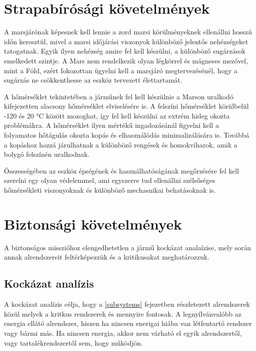 \documentclass[12pt]{report}
\begin{document}
\section{Strapabírósági követelmények}
A marsjárónak képesnek kell lennie a zord marsi körülményeknek ellenállni hosszú időn keresztül, mivel a marsi időjárási viszonyok különböző jelentős nehézségeket tatogatnak. Egyik ilyen nehézség amire fel kell készülni, a különböző sugárzások emelkedett szintje. A Mars nem rendelkezik olyan légkörrel és 
mágneses mezővel, mint a Föld, ezért fokozottan ügyelni kell a marsjáró megtervezésénél, hogy a sugárzás ne csökkenthesse az eszköz tervezett élettartamát. 

A hőmérséklet tekintetében a járműnek fel kell készülnie a Marson uralkodó kifejezetten alacsony hőmérséklet elviselésére is. A felszíni hőmérséklet körülbelül  -120 és 20 °C között mozoghat, így fel kell készülni az extrém hideg okozta problémákra. A hőmérséklet ilyen mértékű ingadozásánál figyelni kell a folyamatos hőtágulás okozta kopás és elhasználódás minimalizálására is. Továbbá a kopáshoz hozzá járulhatnak a különböző rengések és homokviharok, amik a bolygó felszínén uralkodnak.

Összességében az eszköz épségének és használhatóságának megőrzésére fel kell szerelni egy olyan védelemmel, ami egyszerre tud ellenállni szélsőséges hőmérsékleti viszonyoknak és különböző mechasnikai behatásoknak is.


\section{Biztonsági követelmények}

A biztonságos misszióhoz elengedhetetlen a jármű kockázat analaízise, mely során annak alrendszereit feltérképezzük és a kritikusakat meghatározzuk. 

\subsection{Kockázat analízis}



A kockázat analízis célja, hogy a \ref{subsystems} fejezetben részletezett alrendszerek közül melyek a kritkus rendszerek és mennyire fontosak. A legnyílvánvalóbb az energia ellátó alrendszer, hiszen ha nincsen enerigai hiába van létfentartó rendszer vagy bármi más. Ha nincsen energia, akkor nem várható el egyik alrendszertől, vagy tartalékrendszertől sem, hogy működjön.
\end{document}

